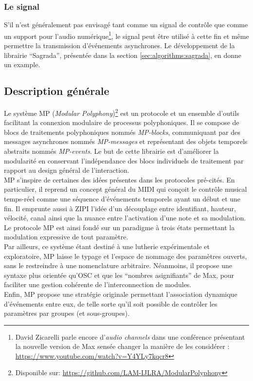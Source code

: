 \subsubsection{Le signal}

\noindent S'il n'est généralement pas envisagé tant comme un signal de contrôle que comme un support pour l'audio numérique\footnote{David Zicarelli parle encore d'\textit{audio channels} dans une conférence présentant la nouvelle version de Max sensée changer la manière de les considérer : \url{https://www.youtube.com/watch?v=Y4YLy7kqcr8}}, le signal peut être utilisé à cette fin et même permettre la transmission d'événements asynchrones. Le développement de la librairie ``Sagrada'', présentée dans la section \ref{sec:algorithms:sagrada}, en donne un example.\\

\subsection{Description générale}

\noindent Le système MP (\textit{Modular Polyphony})\footnote{Disponible sur: \url{https://github.com/LAM-IJLRA/ModularPolyphony}} est un protocole et un ensemble d'outils facilitant la connexion modulaire de processus polyphoniques. Il se compose de blocs de traitements polyphoniques nommés \textit{MP-blocks}, communiquant par des messages asynchrones nommés \textit{MP-messages} et représentant des objets temporels abstraits nommés \textit{MP-events}. Le but de cette librairie est d'améliorer la modularité en conservant l'indépendance des blocs individuels de traitement par rapport au design général de l'interaction.\\
\indent MP s'inspire de certaines des idées présentes dans les protocoles pré-cités. En particulier, il reprend un concept général du \gls{MIDI} qui conçoit le contrôle musical temps-réel comme une séquence d'événements temporels ayant un début et une fin. Il emprunte aussi à \gls{ZIPI} l'idée d'un découplage entre identifiant, hauteur, vélocité, canal ainsi que la nuance entre l'activation d'une note et sa modulation. Le protocole MP est ainsi fondé sur un paradigme à trois états permettant la modulation expressive de tout paramètre.\\
\indent Par ailleurs, ce système étant destiné à une lutherie expérimentale et exploratoire, MP laisse le typage et l'espace de nommage des paramètres ouverts, sans le restreindre à une nomenclature arbitraire. Néanmoins, il propose une syntaxe plus orientée qu'\gls{OSC} et que les ``nombres asignifiants'' de Max, pour faciliter une gestion cohérente de l'interconnection de modules.\\
\indent Enfin, MP propose une stratégie originale permettant l'association dynamique d'événements entre eux, de telle sorte qu'il soit possible de contrôler les paramètres par groupes (et sous-groupes).\\

